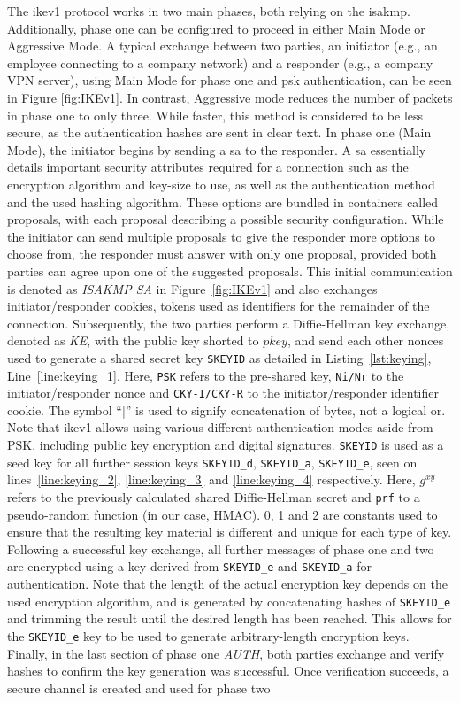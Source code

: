 The \ac{ike}v1 protocol works in two main phases, both relying on the \ac{isakmp}. Additionally, phase one can be configured to proceed in either Main Mode or Aggressive Mode. A typical exchange between two parties, an initiator (e.g., an employee connecting to a company network) and a responder (e.g., a company VPN server), using Main Mode for phase one and \ac{psk} authentication, can be seen in Figure \ref{fig:IKEv1}. In contrast, Aggressive mode reduces the number of packets in phase one to only three. While faster, this method is considered to be less secure, as the authentication hashes are sent in clear text. In phase one (Main Mode), the initiator begins by sending a \ac{sa} to the responder. A \ac{sa} essentially details important security attributes required for a connection such as the encryption algorithm and key-size to use, as well as the authentication method and the used hashing algorithm. These options are bundled in containers called proposals, with each proposal describing a possible security configuration. While the initiator can send multiple proposals to give the responder more options to choose from, the responder must answer with only one proposal, provided both parties can agree upon one of the suggested proposals. This initial communication is denoted as \emph{ISAKMP SA} in Figure~\ref{fig:IKEv1} and also exchanges initiator/responder cookies, tokens used as identifiers for the remainder of the connection. Subsequently, the two parties perform a Diffie-Hellman key exchange, denoted as \emph{KE}, with the public key shorted to $pkey$, and send each other nonces used to generate a shared secret key \texttt{SKEYID} as detailed in Listing~\ref{lst:keying}, Line~\ref{line:keying_1}. Here, \texttt{PSK} refers to the pre-shared key, \texttt{Ni/Nr} to the initiator/responder nonce and \texttt{CKY-I/CKY-R} to the initiator/responder identifier cookie. The symbol ``|'' is used to signify concatenation of bytes, not a logical or. Note that \ac{ike}v1 allows using various different authentication modes aside from PSK, including public key encryption and digital signatures. \texttt{SKEYID} is used as a seed key for all further session keys \texttt{SKEYID\_d}, \texttt{SKEYID\_a}, \texttt{SKEYID\_e}, seen on lines~\ref{line:keying_2}, \ref{line:keying_3} and \ref{line:keying_4} respectively. Here, $g^{xy}$ refers to the previously calculated shared Diffie-Hellman secret and \texttt{prf} to a pseudo-random function (in our case, HMAC). 0, 1 and 2 are constants used to ensure that the resulting key material is different and unique for each type of key. Following a successful key exchange, all further messages of phase one and two are encrypted using a key derived from \texttt{SKEYID\_e} and \texttt{SKEYID\_a} for authentication. Note that the length of the actual encryption key depends on the used encryption algorithm, and is generated by concatenating hashes of \texttt{SKEYID\_e} and trimming the result until the desired length has been reached. This allows for the \texttt{SKEYID\_e} key to be used to generate arbitrary-length encryption keys. Finally, in the last section of phase one \emph{AUTH}, both parties exchange and verify hashes to confirm the key generation was successful. Once verification succeeds, a secure channel is created and used for phase two 